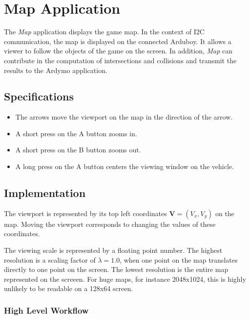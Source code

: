 \documentclass[11pt]{article}
\newcommand{\Vb}{\mathbf{V}}
\newcommand{\Map}{\textsl{Map}}
\begin{document}
\section{Map Application}
\label{sec-map-application}

The \Map{} application displays the game map. In the context of I2C
communication, the map is displayed on the connected Arduboy. It allows a
viewer to follow the objects of the game on the screen. In addition, \Map{}
can contribute in the computation of intersections and collisions and transmit
the results to the Ardymo application.

\subsection{Specifications}
\label{sec-map-specifications}

\begin{itemize}
    \item The arrows move the viewport on the map in the direction of the
        arrow.
    \item A short press on the A button zooms in.
    \item A short press on the B button zooms out.
    \item A long  press on the A button centers the viewing window on the
        vehicle.
\end{itemize}

\subsection{Implementation}
\label{sec-map-implementation}

The viewport is represented by its top left coordinates $\Vb=(V_{x}, V_{y})$
on the map. Moving the viewport corresponds to changing the values of these
coordinates.

The viewing scale is represented by a floating point number. The highest
resolution is a scaling factor of $\lambda=1.0$, when one point on the map
translates directly to one point on the screen. The lowest resolution is the
entire map represented on the screeen. For huge maps, for instance
2048x1024, this is highly unlikely to be readable on a 128x64 screen.

\subsubsection{High Level Workflow}
\label{sec-map-implementation-workflow}
\end{document}
